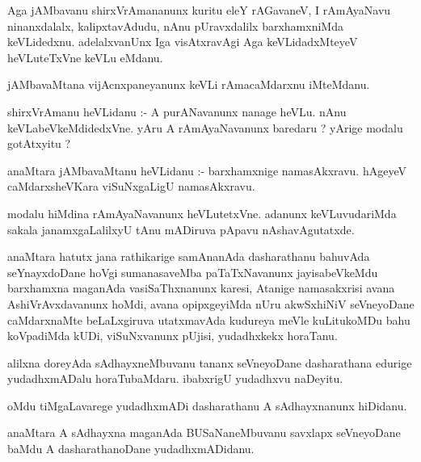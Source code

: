 \documentclass{article}
\begin{document}
\begin{mn}
Aga  jAMbavanu  shirxVrAmananunx  kuritu  eleY  rAGavaneV,  I  rAmAyaNavu  ninanxdalalx,  kalipxtavAdudu,  
nAnu  pUravxdalilx  barxhamxniMda  keVLidedxnu.  adelalxvanUnx  Iga  visAtxravAgi Aga  keVLidadxMteyeV  
heVLuteTxVne  keVLu  eMdanu.
\end{mn}

\begin{mn}
jAMbavaMtana  vijAcnxpaneyanunx  keVLi  rAmacaMdarxnu  iMteMdanu.  
\end{mn}

\begin{mn}
shirxVrAmanu  heVLidanu :- A  purANavanunx  nanage  heVLu.  nAnu  keVLabeVkeMdidedxVne.  yAru  A  
rAmAyaNavanunx  baredaru ?  yArige  modalu  gotAtxyitu ?
\end{mn}

\begin{mn}
anaMtara  jAMbavaMtanu  heVLidanu :- barxhamxnige  namasAkxravu.  hAgeyeV  caMdarxsheVKara  viSuNxgaLigU  namasAkxravu.
\end{mn}

\begin{mn}
modalu  hiMdina  rAmAyaNavanunx  heVLutetxVne.  adanunx  keVLuvudariMda  sakala  janamxgaLalilxyU  tAnu  
mADiruva  pApavu  nAshavAgutatxde.
\end{mn}

\begin{mn}
anaMtara  hatutx jana  rathikarige  samAnanAda  dasharathanu  bahuvAda  seYnayxdoDane  hoVgi  sumanasaveMba  
paTaTxNavanunx  jayisabeVkeMdu  barxhamxna  maganAda  vasiSaThxnanunx  karesi,  Atanige  namasakxrisi  avana  
AshiVrAvxdavanunx  hoMdi,  avana  opipxgeyiMda  nUru  akwSxhiNiV  seVneyoDane  caMdarxnaMte  beLaLxgiruva  
utatxmavAda  kudureya  meVle  kuLitukoMDu  bahu  koVpadiMda  kUDi,  viSuNxvanunx  pUjisi,  yudadhxkekx  horaTanu.
\end{mn}

\begin{mn}
alilxna  doreyAda  sAdhayxneMbuvanu  tananx  seVneyoDane  dasharathana  edurige  yudadhxmADalu  horaTubaMdaru.  
ibabxrigU  yudadhxvu  naDeyitu.
\end{mn}

\begin{mn}
oMdu  tiMgaLavarege  yudadhxmADi  dasharathanu  A  sAdhayxnanunx  hiDidanu.
\end{mn}

\begin{mn}
anaMtara  A  sAdhayxna  maganAda  BUSaNaneMbuvanu  savxlapx  seVneyoDane  baMdu  A  dasharathanoDane  yudadhxmADidanu.  
\end{mn}
\end{document}
